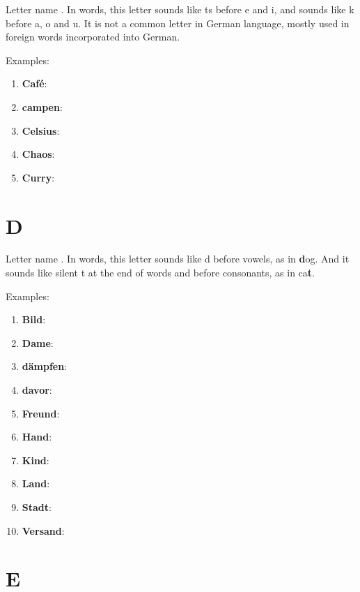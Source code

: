 Letter name \textipa{[tse:]}. In words, this letter sounds like ts before e and i, and sounds like k before a, o and u. It is not a common letter in German language, mostly used in foreign words incorporated into German.

Examples:
\begin{enumerate}
    \item \textbf{Café}: \textipa{[ka"fe:]}
    \item \textbf{campen}: \textipa{["kEmp@n]}
    \item \textbf{Celsius}: \textipa{["tselziUs]}
    \item \textbf{Chaos}: \textipa{["ka:os]}
    \item \textbf{Curry}: \textipa{["k{\oe}ri]}
\end{enumerate}

\section*{D}

Letter name \textipa{[de:]}. In words, this letter sounds like d before vowels, as in \textbf{d}og. And it sounds like silent t at the end of words and before consonants, as in ca\textbf{t}.

Examples:
\begin{enumerate}
    \item \textbf{Bild}: \textipa{[bIlt]}
    \item \textbf{Dame}: \textipa{["da:m@]}
    \item \textbf{dämpfen}: \textipa{["dEmpf@n]}
    \item \textbf{davor}: \textipa{["da:fOr,da"fo:r]}
    \item \textbf{Freund}: \textipa{[frOYnt]}
    \item \textbf{Hand}: \textipa{[hant]}
    \item \textbf{Kind}: \textipa{[kint]}
    \item \textbf{Land}: \textipa{[lant]}
    \item \textbf{Stadt}: \textipa{[Stat]}
    \item \textbf{Versand}: 
\end{enumerate}

\section*{E}

